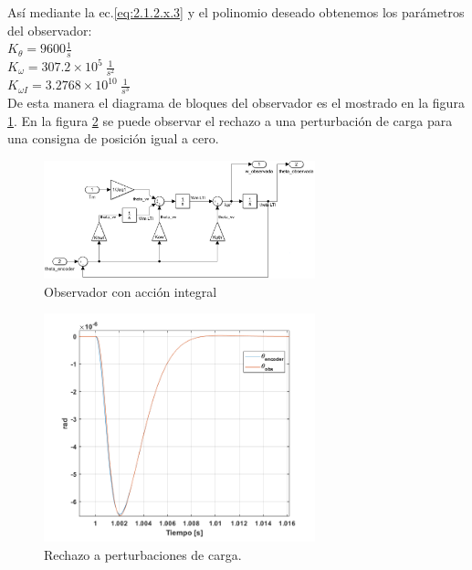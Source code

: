 \documentclass[10pt]{article}
\begin{document}
\begin{itemize}
	Así mediante la ec.\ref{eq:2.1.2.x.3} y el polinomio deseado obtenemos los parámetros del observador:\\
	$K_{\theta}=9600 \frac{1}{s}$\\
	$K_{\omega}=307.2 \times 10^{5} \ \frac{1}{s^{2}}$\\
	$K_{\omega I}=3.2768 \times  10^{10} \ \frac{1}{s^{3}}$\\

	De esta manera el diagrama de bloques del observador es el mostrado en la figura \ref{fig:observadornuevo}. En la figura \ref{fig:obs} se puede observar el rechazo a una perturbación de carga para una consigna de posición igual a cero.
	\begin{figure}[h!]
		\centering
		\includegraphics[width=0.7\textwidth]{observadornuevo.png}
		\caption{\label{fig:observadornuevo}Observador con acción integral}
		\end{figure}
	
	\begin{figure}[h!]
		\centering
		\includegraphics[width=0.7\textwidth]{obs.png}
		\caption{\label{fig:obs}Rechazo a perturbaciones de carga.}
		\end{figure}


\end{itemize}
\end{document}
